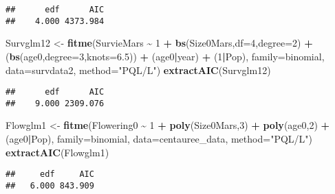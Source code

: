 \documentclass[
]{article}
\newenvironment{Shaded}{\begin{snugshade}}{\end{snugshade}}
\newcommand{\AttributeTok}[1]{\textcolor[rgb]{0.13,0.29,0.53}{#1}}
\newcommand{\DecValTok}[1]{\textcolor[rgb]{0.00,0.00,0.81}{#1}}
\newcommand{\FloatTok}[1]{\textcolor[rgb]{0.00,0.00,0.81}{#1}}
\newcommand{\FunctionTok}[1]{\textcolor[rgb]{0.13,0.29,0.53}{\textbf{#1}}}
\newcommand{\NormalTok}[1]{#1}
\newcommand{\OtherTok}[1]{\textcolor[rgb]{0.56,0.35,0.01}{#1}}
\newcommand{\SpecialCharTok}[1]{\textcolor[rgb]{0.81,0.36,0.00}{\textbf{#1}}}
\newcommand{\StringTok}[1]{\textcolor[rgb]{0.31,0.60,0.02}{#1}}
\begin{document}
\begin{verbatim}
##      edf      AIC 
##    4.000 4373.984
\end{verbatim}

\begin{Shaded}
\begin{Highlighting}[]
\NormalTok{Survglm12 }\OtherTok{\textless{}{-}} \FunctionTok{fitme}\NormalTok{(SurvieMars }\SpecialCharTok{\textasciitilde{}} \DecValTok{1} \SpecialCharTok{+} \FunctionTok{bs}\NormalTok{(Size0Mars,}\AttributeTok{df=}\DecValTok{4}\NormalTok{,}\AttributeTok{degree=}\DecValTok{2}\NormalTok{) }\SpecialCharTok{+}\NormalTok{(}\FunctionTok{bs}\NormalTok{(age0,}\AttributeTok{degree=}\DecValTok{3}\NormalTok{,}\AttributeTok{knots=}\FloatTok{6.5}\NormalTok{)) }\SpecialCharTok{+} 
\NormalTok{                                  (age0}\SpecialCharTok{|}\NormalTok{year) }\SpecialCharTok{+}\NormalTok{ (}\DecValTok{1}\SpecialCharTok{|}\NormalTok{Pop),}
                  \AttributeTok{family=}\NormalTok{binomial,}
                  \AttributeTok{data=}\NormalTok{survdata2,}
                  \AttributeTok{method=}\StringTok{"PQL/L"}\NormalTok{)}
\FunctionTok{extractAIC}\NormalTok{(Survglm12)}
\end{Highlighting}
\end{Shaded}

\begin{verbatim}
##      edf      AIC 
##    9.000 2309.076
\end{verbatim}

\begin{Shaded}
\begin{Highlighting}[]
\NormalTok{Flowglm1 }\OtherTok{\textless{}{-}} \FunctionTok{fitme}\NormalTok{(Flowering0 }\SpecialCharTok{\textasciitilde{}}  \DecValTok{1} \SpecialCharTok{+} \FunctionTok{poly}\NormalTok{(Size0Mars,}\DecValTok{3}\NormalTok{) }\SpecialCharTok{+} \FunctionTok{poly}\NormalTok{(age0,}\DecValTok{2}\NormalTok{) }\SpecialCharTok{+} 
\NormalTok{                    (age0}\SpecialCharTok{|}\NormalTok{Pop),}
                 \AttributeTok{family=}\NormalTok{binomial,}
                 \AttributeTok{data=}\NormalTok{centauree\_data, }\AttributeTok{method=}\StringTok{"PQL/L"}\NormalTok{)}
\FunctionTok{extractAIC}\NormalTok{(Flowglm1)}
\end{Highlighting}
\end{Shaded}

\begin{verbatim}
##     edf     AIC 
##   6.000 843.909
\end{verbatim}
\end{document}
